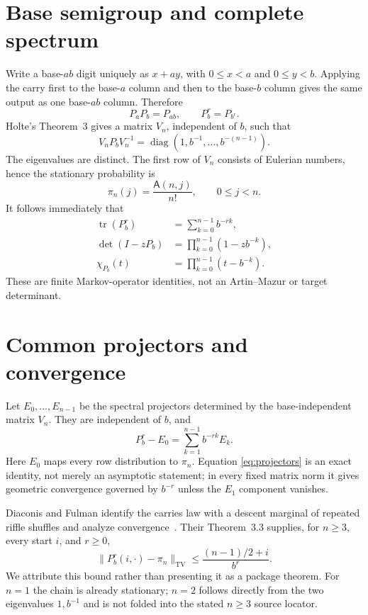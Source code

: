 \documentclass[9pt]{extarticle}
\newcommand{\TV}{\mathrm{TV}}
\newcommand{\A}{\mathsf A}
\begin{document}
\section{Base semigroup and complete spectrum}
Write a base-$ab$ digit uniquely as $x+ay$, with $0\le x<a$ and
$0\le y<b$.  Applying the carry first to the base-$a$ column and then to the
base-$b$ column gives the same output as one base-$ab$ column.  Therefore
\begin{equation}\label{eq:semigroup}
 P_aP_b=P_{ab},\qquad P_b^r=P_{b^r}.
\end{equation}
Holte's Theorem~3 gives a matrix $V_n$, independent of $b$, such that
\begin{equation}\label{eq:diagonal}
 V_nP_bV_n^{-1}=\operatorname{diag}
 (1,b^{-1},\ldots,b^{-(n-1)}).
\end{equation}
The eigenvalues are distinct.  The first row of $V_n$ consists of Eulerian
numbers, hence the stationary probability is
\[
 \pi_n(j)=\frac{\A(n,j)}{n!},\qquad0\le j<n.
\]
It follows immediately that
\begin{align}
 \operatorname{tr}(P_b^r)&=\sum_{k=0}^{n-1}b^{-rk},\label{eq:trace}\\
 \det(I-zP_b)&=\prod_{k=0}^{n-1}(1-zb^{-k}),\label{eq:det}\\
 \chi_{P_b}(t)&=\prod_{k=0}^{n-1}(t-b^{-k}).\label{eq:char}
\end{align}
These are finite Markov-operator identities, not an Artin--Mazur or target
determinant.

\section{Common projectors and convergence}
Let $E_0,\ldots,E_{n-1}$ be the spectral projectors determined by the
base-independent matrix $V_n$.  They are independent of $b$, and
\begin{equation}\label{eq:projectors}
 P_b^r-E_0=\sum_{k=1}^{n-1}b^{-rk}E_k.
\end{equation}
Here $E_0$ maps every row distribution to $\pi_n$.  Equation
\eqref{eq:projectors} is an exact identity, not merely an asymptotic statement;
in every fixed matrix norm it gives geometric convergence governed by
$b^{-r}$ unless the $E_1$ component vanishes.

Diaconis and Fulman identify the carries law with a descent marginal of
repeated riffle shuffles and analyze convergence~\cite{DF09}.  Their
Theorem~3.3 supplies, for $n\ge3$, every start $i$, and $r\ge0$,
\begin{equation}\label{eq:tv}
 \lVert P_b^r(i,\cdot)-\pi_n\rVert_{\TV}
 \le \frac{(n-1)/2+i}{b^r}.
\end{equation}
We attribute this bound rather than presenting it as a package theorem.
For $n=1$ the chain is already stationary; $n=2$ follows directly from the
two eigenvalues $1,b^{-1}$ and is not folded into the stated $n\ge3$ source
locator.
\end{document}
